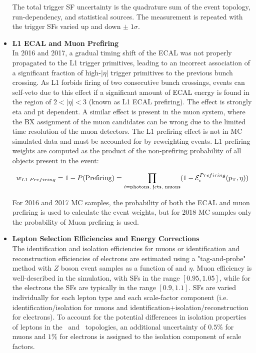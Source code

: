 \begin{itemize}
    The total trigger SF uncertainty is the quadrature sum of the event topology, run-dependency, and statistical sources.
    The measurement is repeated with the trigger SFs varied up and down $\pm \; 1 \sigma$.
    \item {\bf L1 ECAL and Muon Prefiring} \\
    In 2016 and 2017, a gradual timing shift of the ECAL was not properly propagated to the L1 trigger primitives, leading to an incorrect association of a significant fraction of high-$\vert \eta \vert$ trigger primitives to the previous bunch crossing.
    As L1 forbids firing of two consecutive bunch crossings, events can self-veto due to this effect if a significant amount of ECAL energy is found in the region of $2<\vert \eta \vert<3$ (known as L1 ECAL prefiring).
    The effect is strongly eta and pt dependent.
    A similar effect is present in the muon system, where the BX assignment of the muon candidates can be wrong due to the limited time resolution of the muon detectors. 
    The L1 prefiring effect is not in MC simulated data and must be accounted for by reweighting events.
    L1 prefiring weights are computed as the product of the non-prefiring probability of all objects present in the event:
    \begin{linenomath*}
    \begin{align}
    w_{L1 \; Prefiring} = 1 - P(\text{Prefiring}) = \prod_{i=\text{photons, jets, muons}} (1 - \mathcal{E}_i^{Prefiring} (p_{\mathrm{T}},\eta))
    \end{align}
    \end{linenomath*}
    For 2016 and 2017 MC samples, the probability of both the ECAL and muon prefiring is used to calculate the event weights, but for 2018 MC samples only the probability of Muon prefiring is used.
    \item {\bf Lepton Selection Efficiencies and Energy Corrections} \\
    The identification and isolation efficiencies for muons or identification and reconstruction efficiencies of electrons are estimated using a "tag-and-probe" method with $Z$ boson event samples as a function of \pT and $\eta$. 
    Muon efficiency is well-described in the simulation, with SFs in the range $[0.95,1.05]$, while for the electrons the SFs are typically in the range $[0.9,1.1]$. 
    SFs are varied individually for each lepton type and each scale-factor component (i.e. identification/isolation for muons and identification+isolation/reconstruction for electrons). 
    To account for the potential differences in isolation properties of leptons in the \ttbar\ and \zjets\ topologies, an additional uncertainty of $0.5\%$ for muons and $1\%$ for electrons is assigned to the isolation component of scale factors.

\end{itemize}
